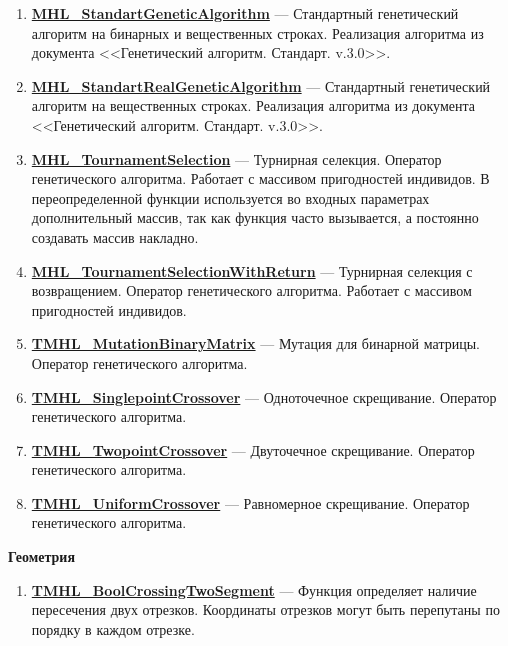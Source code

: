 \documentclass[a4paper,12pt]{article}
\begin{document}
\begin{enumerate}
\item \textbf{\hyperref[MHL_StandartGeneticAlgorithm]{MHL\_StandartGeneticAlgorithm}} --- Стандартный генетический алгоритм на бинарных и вещественных строках. Реализация алгоритма из документа <<Генетический алгоритм. Стандарт. v.3.0>>.

\item \textbf{\hyperref[MHL_StandartRealGeneticAlgorithm]{MHL\_StandartRealGeneticAlgorithm}} --- Стандартный генетический алгоритм на вещественных строках. Реализация алгоритма из документа <<Генетический алгоритм. Стандарт. v.3.0>>.

\item \textbf{\hyperref[MHL_TournamentSelection]{MHL\_TournamentSelection}} --- Турнирная селекция. Оператор генетического алгоритма. Работает с массивом пригодностей индивидов. В переопределенной функции используется во входных параметрах дополнительный массив, так как функция часто вызывается, а постоянно создавать массив накладно.

\item \textbf{\hyperref[MHL_TournamentSelectionWithReturn]{MHL\_TournamentSelectionWithReturn}} --- Турнирная селекция с возвращением. Оператор генетического алгоритма. Работает с массивом пригодностей индивидов.

\item \textbf{\hyperref[TMHL_MutationBinaryMatrix]{TMHL\_MutationBinaryMatrix}} --- Мутация для бинарной матрицы. Оператор генетического алгоритма.

\item \textbf{\hyperref[TMHL_SinglepointCrossover]{TMHL\_SinglepointCrossover}} --- Одноточечное скрещивание. Оператор генетического алгоритма.

\item \textbf{\hyperref[TMHL_TwopointCrossover]{TMHL\_TwopointCrossover}} --- Двуточечное скрещивание. Оператор генетического алгоритма.

\item \textbf{\hyperref[TMHL_UniformCrossover]{TMHL\_UniformCrossover}} --- Равномерное скрещивание. Оператор генетического алгоритма.

\end{enumerate}

\textbf{Геометрия}
\begin{enumerate}

\item \textbf{\hyperref[TMHL_BoolCrossingTwoSegment]{TMHL\_BoolCrossingTwoSegment}} --- Функция определяет наличие пересечения двух отрезков. Координаты отрезков могут быть перепутаны по порядку в каждом отрезке.

\end{enumerate}
\end{document}
